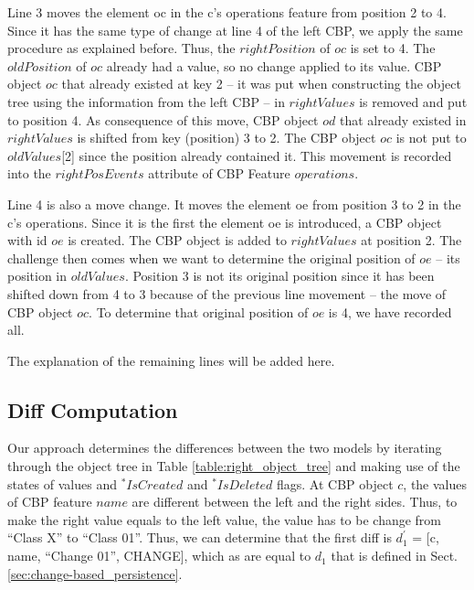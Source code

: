 \documentclass{llncs}
\begin{document}
Line 3 moves the element \textsf{oc} in the \textsf{c}'s \textsf{operations} feature from position 2 to 4.  Since it has the same type of change at line 4 of the left CBP,  we apply the same procedure as explained before. Thus, the $rightPosition$ of $oc$ is set to 4. The $oldPosition$ of $oc$ already had a value, so no change applied to its value. CBP object $oc$ that already existed at key 2 -- it was put when constructing the object tree using the information from the left CBP -- in $rightValues$ is removed and put to position 4. As consequence of this move, CBP object $od$ that already existed in $rightValues$ is shifted from key (position) 3 to 2. The CBP object $oc$ is not put to $oldValues$[2] since the position already contained it. This movement is recorded into the $rightPosEvents$ attribute of CBP Feature $operations$.        

Line 4 is also a move change. It moves the element \textsf{oe} from position 3 to 2 in the \textsf{c}'s \textsf{operations}. Since it is the first the element \textsf{oe} is introduced, a CBP object with id $oe$ is created. The CBP object is added to $rightValues$ at position 2. The challenge then comes when we want to determine the original position of $oe$ -- its position in $oldValues$. Position 3 is not its original position since it has been shifted down from 4 to 3 because of the previous line movement -- the move of CBP object $oc$. To determine that original position of $oe$ is 4, we have recorded all.

The explanation of the remaining lines will be added here.




\subsection{Diff Computation}
\label{sec:diff_computation}
Our approach determines the differences between the two models by iterating through the object tree in Table \ref{table:right_object_tree} and making use of the states of values and $^*IsCreated$ and $^*IsDeleted$ flags. At CBP object $c$, the values of CBP feature $name$ are different between the left and the right sides. Thus, to make the right value equals to the left value, the value has to be change from ``Class X'' to ``Class 01''. Thus, we can determine that the first diff is $d_1^\prime$ = [\textsf{c}, \textsf{name}, ``Change 01'', \textsf{CHANGE}], which as are equal to $d_1$ that is defined in Sect. \ref{sec:change-based_persistence}.
\end{document}

